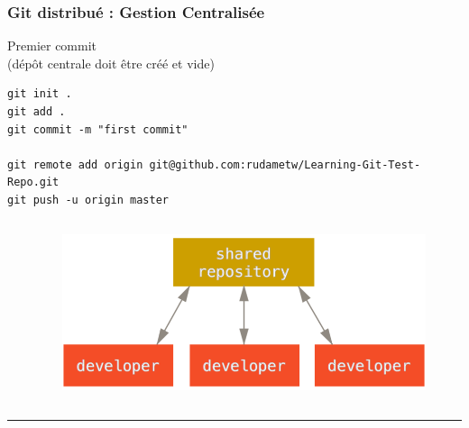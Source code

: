 \documentclass[table,tikz,12pt,svgnames]{beamer}
\begin{document}
\begin{frame}[fragile]
\frametitle{Git distribué : Gestion Centralisée}
\begin{adjustwidth}{-2em}{0cm}{}
\color{darkgreen}%
\noindent
Premier commit \\ \small(dépôt centrale doit être créé et vide)
\color{black}
\end{adjustwidth}
\begin{adjustwidth}{-1em}{0cm}{}
\begin{verbatim}
git init .
git add .
git commit -m "first commit"

git remote add origin git@github.com:rudametw/Learning-Git-Test-Repo.git
git push -u origin master
\end{verbatim}
\end{adjustwidth}

\begin{adjustwidth}{-0cm}{0cm}{}
	\begin{columns}[T] %
		\begin{column}{.6\textwidth}
		\end{column}%
		\begin{column}{.3\textwidth}
			\color{black}
			\vspace{-11em}
			\begin{adjustwidth}{-0cm}{-3cm}{}
				\begin{figure}
					\hfill
					\includegraphics[scale=0.22]{images/centralized_workflow.png}
				\end{figure}
			\end{adjustwidth}
		\end{column}%
	\end{columns}
	\vspace{-1em}
	\pause
	\color{darkgray}\rule{\linewidth}{2pt}
	

\end{adjustwidth}
\end{frame}
\end{document}
